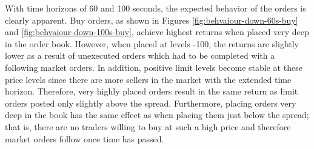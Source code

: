 With time horizons of 60 and 100 seconds, the expected behavior of the orders is clearly apparent.
Buy orders, as shown in Figures \ref{fig:behvaiour-down-60s-buy} and \ref{fig:behvaiour-down-100s-buy}, achieve highest returns when placed very deep in the order book.
However, when placed at levels -100, the returns are slightly lower as a result of unexecuted orders which had to be completed with a following market orders.
In addition, positive limit levels become stable at these price levels since there are more sellers in the market with the extended time horizon.  Therefore, very highly placed orders result in the same return as limit orders posted only slightly above the spread.
Furthermore, placing orders very deep in the book has the same effect as when placing them just below the spread; that is, there are no traders willing to buy at such a high price and therefore market orders follow once time has passed.
\vfill
\newpage
